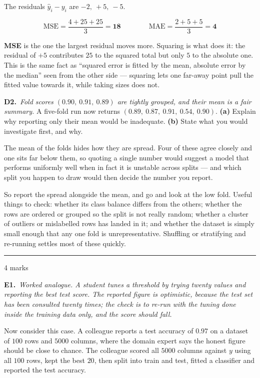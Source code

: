 \documentclass[10pt,a4paper]{article}
\newcommand{\parthead}[2]{\vspace{2pt}\noindent\rule{\linewidth}{0.4pt}\par\vspace{2pt}%
  \noindent{\bfseries Part #1}\hfill{\small #2}\par\vspace{1pt}}
\newcommand{\sol}[1]{\textbf{#1}}
\begin{document}
The residuals $\hat y_i - y_i$ are $-2,\ +5,\ -5$.

\[ \mathrm{MSE} = \frac{4 + 25 + 25}{3} = \sol{18} \qquad\qquad \mathrm{MAE} = \frac{2 + 5 + 5}{3} = \sol{4} \]

\sol{MSE} is the one the largest residual moves more. Squaring is what does it: the residual of $+5$ contributes $25$ to the squared total but only $5$ to the absolute one. This is the same fact as ``squared error is fitted by the mean, absolute error by the median'' seen from the other side --- squaring lets one far-away point pull the fitted value towards it, while taking sizes does not.

\vspace{6pt}

\textbf{D2.}\ \emph{Fold scores $(0.90,\ 0.91,\ 0.89)$ are tightly grouped, and their mean is a fair summary.} A five-fold run now returns $(0.89,\ 0.87,\ 0.91,\ 0.54,\ 0.90)$. \textbf{(a)} Explain why reporting only their mean would be inadequate. \textbf{(b)} State what you would investigate first, and why.

\vspace{2pt}

The mean of the folds hides how they are spread. Four of these agree closely and one sits far below them, so quoting a single number would suggest a model that performs uniformly well when in fact it is unstable across splits --- and which split you happen to draw would then decide the number you report.\par\vspace{1mm}So report the spread alongside the mean, and go and look at the low fold. Useful things to check: whether its class balance differs from the others; whether the rows are ordered or grouped so the split is not really random; whether a cluster of outliers or mislabelled rows has landed in it; and whether the dataset is simply small enough that any one fold is unrepresentative. Shuffling or stratifying and re-running settles most of these quickly.

\newpage

\parthead{E --- Reasoning}{4 marks}

\textbf{E1.}\ \emph{Worked analogue. A student tunes a threshold by trying twenty values and reporting the best test
score. The reported figure is optimistic, because the test set has been consulted twenty times; the check is
to re-run with the tuning done inside the training data only, and the score should fall.}

\vspace{2mm}
Now consider this case. A colleague reports a test accuracy of $0.97$ on a dataset of $100$ rows and $5000$
columns, where the domain expert says the honest figure should be close to chance. The colleague scored all
$5000$ columns against $y$ using all $100$ rows, kept the best $20$, then split into train and test, fitted a
classifier and reported the test accuracy.
\end{document}
